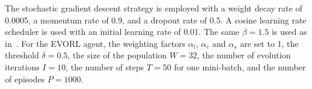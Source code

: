 \documentclass[letterpaper]{article} %
\def \eg {\emph{e.g.}}
\def \ie {\emph{i.e.}}
\newcommand\blue[1]{\textcolor{blue}{#1}}
\newcommand\rjf[1]{\textcolor{red}{\{RJF: #1\}}}
\begin{document}
The stochastic gradient descent strategy is employed with a weight decay rate of 0.0005, a momentum rate of 0.9, and a dropout rate of 0.5.
A cosine learning rate scheduler is used with an initial learning rate of 0.01. %
The same $\beta = 1.5$ is used as in~\cite{Huang_2022_UFPMP}. For the EVORL agent, the weighting factors $\alpha_l$, $\alpha_c$ and $\alpha_s$ are set to 1, the threshold $\delta = 0.5$, the size of the population $W=32$, the number of evolution iterations $I = 10$, the number of steps $T=50$ for one mini-batch, and the number of episodes $P = 1000$. %


\end{document}
